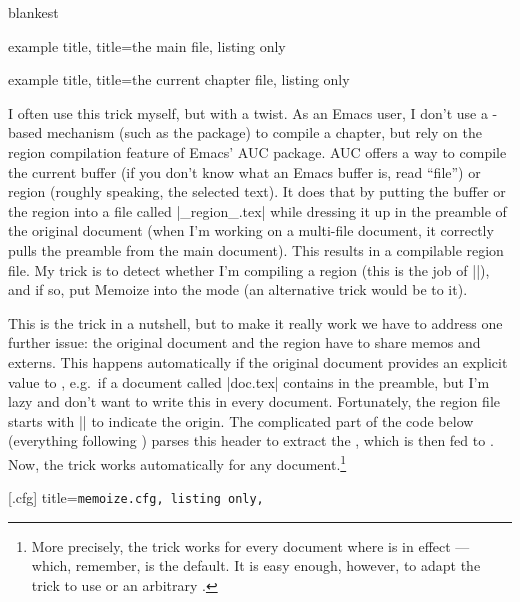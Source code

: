 \documentclass[a4paper,11pt]{article}
\begin{document}
\begin{tcboxedraster}[raster columns=2, raster valign=top]{blankest}
  \begin{tcblisting}{example title, title=the main file, listing only}

  \end{tcblisting}
  \begin{tcblisting}{example title, title=the current chapter file, listing only}
  \end{tcblisting}
\end{tcboxedraster}

\begin{tcolorbox}[title=For \Emacs users]
  I often use this  trick myself, but with a twist.  As an Emacs user,
  I don't use a -based mechanism (such as the  package) to
  compile a chapter, but rely on the region compilation feature of Emacs'
  AUC package.  AUC offers a way to compile the current
  buffer (if you don't know what an Emacs buffer is, read ``file'') or region
  (roughly speaking, the selected text).  It does that by putting the buffer or
  the region into a file called |_region_.tex| while dressing it up in the
  preamble of the original document (when I'm working on a multi-file document,
  it correctly pulls the preamble from the main document).  This results in a
  compilable region file.  My trick is to detect whether I'm compiling a region
  (this is the job of |\ifregion|), and if so, put Memoize into the 
  mode (an alternative trick would be to  it).

  This is the trick in a nutshell, but to make it really work we have to
  address one further issue: the original document and the region have to share
  memos and externs.  This happens automatically if the original document
  provides an explicit value to , e.g.\ if a document called
  |doc.tex| contains  in the preamble, but I'm lazy
  and don't want to write this in every document.  Fortunately, the region file
  starts with || to
  indicate the origin.  The complicated part of the code below (everything
  following ) parses this header to
  extract the , which is then fed to .  Now, the trick works automatically for any document.\footnote{More
    precisely, the trick works for every document where  is in
    effect --- which, remember, is the default.  It is easy enough, however, to
    adapt the trick to use  or an arbitrary
    .}

  [.cfg]{
    title=\tt memoize.cfg,
    listing only,
  }
\end{tcolorbox}
\end{document}
